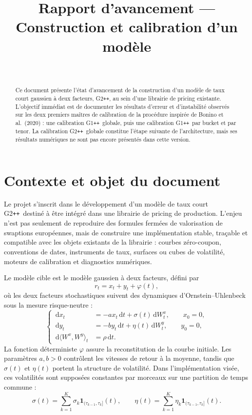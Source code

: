 \documentclass[11pt,a4paper]{article}
\title{Rapport d'avancement --- Construction et calibration d'un modèle \Gpp}
\author{\placeholder{Nom de l'auteur}\\
\placeholder{Équipe / Direction / Entreprise}}
\date{\placeholder{Date de rédaction}}
\newcommand{\Gpp}{G2\texttt{++}}
\newcommand{\Gopp}{G1\texttt{++}}
\newcommand{\dd}{\,\mathrm{d}}
\begin{document}
\maketitle

\begin{abstract}
Ce document présente l'état d'avancement de la construction d'un modèle de taux court gaussien à deux facteurs, \Gpp, au sein d'une librairie de pricing existante. L'objectif immédiat est de documenter les résultats d'erreur et d'instabilité observés sur les deux premiers maîtres de calibration de la procédure inspirée de Bonino et al.\ (2020) : une calibration \Gopp\ globale, puis une calibration \Gopp\ par bucket et par tenor. La calibration \Gpp\ globale constitue l'étape suivante de l'architecture, mais ses résultats numériques ne sont pas encore présentés dans cette version.
\end{abstract}

\tableofcontents
\newpage

\section{Contexte et objet du document}

Le projet s'inscrit dans le développement d'un modèle de taux court \Gpp\ destiné à être intégré dans une librairie de pricing de production. L'enjeu n'est pas seulement de reproduire des formules fermées de valorisation de swaptions européennes, mais de construire une implémentation stable, traçable et compatible avec les objets existants de la librairie : courbes zéro-coupon, conventions de dates, instruments de taux, surfaces ou cubes de volatilité, moteurs de calibration et diagnostics numériques.

Le modèle cible est le modèle gaussien à deux facteurs, défini par
\begin{equation}
    r_t = x_t + y_t + \varphi(t),
\end{equation}
où les deux facteurs stochastiques suivent des dynamiques d'Ornstein--Uhlenbeck sous la mesure risque-neutre :
\begin{equation}
\left\{
\begin{aligned}
    \dd x_t &= -a x_t\dd t + \sigma(t)\dd W_t^x, \qquad x_0=0,\\
    \dd y_t &= -b y_t\dd t + \eta(t)\dd W_t^y, \qquad y_0=0,\\
    \dd\langle W^x,W^y\rangle_t &= \rho\dd t.
\end{aligned}
\right.
\end{equation}
La fonction déterministe $\varphi$ assure la reconstitution de la courbe initiale. Les paramètres $a,b>0$ contrôlent les vitesses de retour à la moyenne, tandis que $\sigma(t)$ et $\eta(t)$ portent la structure de volatilité. Dans l'implémentation visée, ces volatilités sont supposées constantes par morceaux sur une partition de temps commune :
\begin{equation}
    \sigma(t)=\sum_{k=1}^{K}\sigma_k\mathbf 1_{(\tau_{k-1},\tau_k]}(t),
    \qquad
    \eta(t)=\sum_{k=1}^{K}\eta_k\mathbf 1_{(\tau_{k-1},\tau_k]}(t).
\end{equation}
\end{document}
